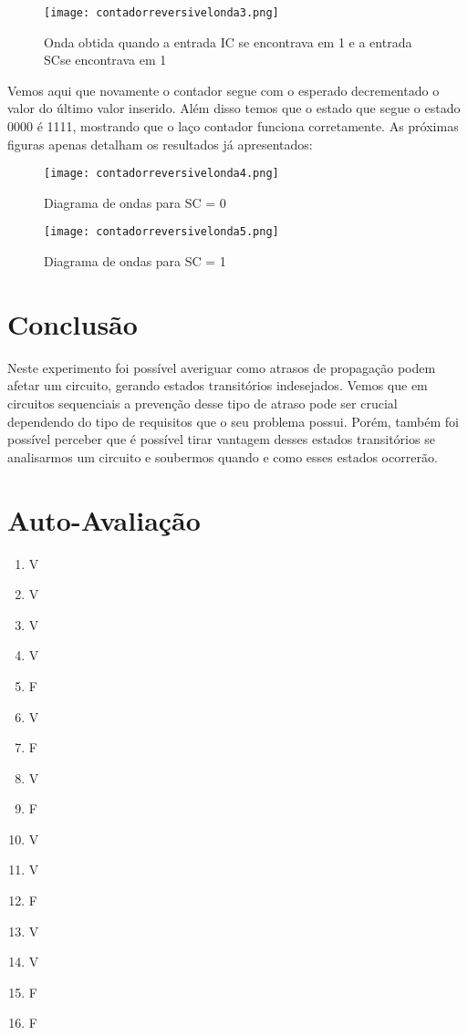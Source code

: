 \documentclass[12pt]{article}
\begin{document}
	
	\begin{figure}[H]
		\centering
		\texttt{[image: contadorreversivelonda3.png]}
		\caption{ Onda obtida quando a entrada IC se encontrava em 1 e a entrada SCse encontrava em 1 }
		\label{fig:contadorreversivelonda3}
	\end{figure}
	
	Vemos aqui que novamente o contador segue com o esperado decrementado o valor do último valor inserido. Além disso temos que o estado que segue o estado 0000 é 1111, mostrando que o laço contador funciona corretamente. As próximas figuras apenas detalham os resultados já apresentados:
	
	
	\begin{figure}[H]
		\centering
		\texttt{[image: contadorreversivelonda4.png]}
		\caption{ Diagrama de ondas para SC = 0 }
		\label{fig:contadorreversivelonda4}
	\end{figure}
	
		\begin{figure}[H]
			\centering
			\texttt{[image: contadorreversivelonda5.png]}
			\caption{ Diagrama de ondas para SC = 1 }
			\label{fig:contadorreversivelonda5}
		\end{figure}



	
	\section{Conclusão}
	\label{sec:Conclusao}
	
	Neste experimento foi possível averiguar como atrasos de propagação podem afetar um circuito, gerando estados transitórios indesejados. Vemos que em circuitos sequenciais a prevenção desse tipo de atraso pode ser crucial dependendo do tipo de requisitos que o seu problema possui. Porém, também foi possível perceber que é possível tirar vantagem desses estados transitórios se analisarmos um circuito e soubermos quando e como esses estados ocorrerão. 

	\newpage 
	\section*{Auto-Avaliação}
	
	\begin{enumerate}
		\item V
		\item V
		\item V
		\item V
		\item F
		\item V
		\item F
		\item V
		\item F
		\item V
		\item V
		\item F
		\item V
		\item V
		\item F
		\item F
		
	\end{enumerate}
	
	
\end{document}
